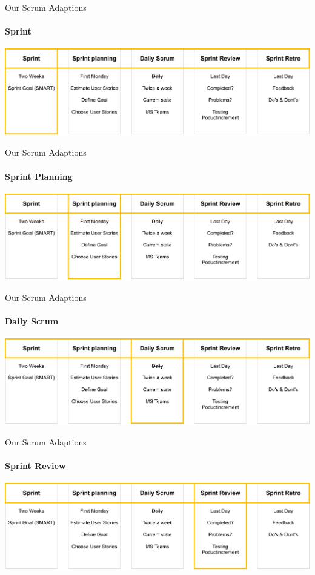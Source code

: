 \documentclass[
    ngerman,%
    authorontitle=true,
]{bfhbeamer}
\begin{document}
    \begin{frame}{Our Scrum Adaptions}
        \framesubtitle{Sprint}
        \includegraphics[width=1\textwidth]{pictures/scrum_adaptions-Sprint}
    \end{frame}

    \begin{frame}{Our Scrum Adaptions}
        \framesubtitle{Sprint Planning}
        \includegraphics[width=1\textwidth]{pictures/scrum_adaptions-Sprint_Planning}
    \end{frame}

    \begin{frame}{Our Scrum Adaptions}
        \framesubtitle{Daily Scrum}
        \includegraphics[width=1\textwidth]{pictures/scrum_adaptions-Daily_Scrum}
    \end{frame}

    \begin{frame}{Our Scrum Adaptions}
        \framesubtitle{Sprint Review}
        \includegraphics[width=1\textwidth]{pictures/scrum_adaptions-Sprint_Review}
    \end{frame}
\end{document}
